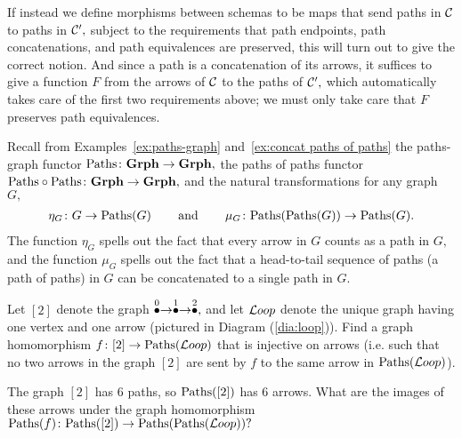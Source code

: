 \documentclass[CT4S-EN-RU]{subfiles}
\begin{document}
\begin{blockRUS}
\end{blockRUS}

\begin{blockENG}
If instead we define morphisms between schemas to be maps that send paths in $\mathcal{C}$ to paths in $\mathcal{C}',$ subject to the requirements that path endpoints, path concatenations, and path equivalences are preserved, this will turn out to give the correct notion. And since a path is a concatenation of its arrows, it suffices to give a function $F$ from the arrows of $\mathcal{C}$ to the paths of $\mathcal{C}',$ which automatically takes care of the first two requirements above; we must only take care that $F$ preserves path equivalences.
\end{blockENG}

\begin{blockRUS}
\end{blockRUS}

\begin{blockENG}
Recall from Examples~\ref{ex:paths-graph} and~\ref{ex:concat paths of paths} the paths-graph functor $\textnormal{Paths}\colon{\mathbf{Grph}}\rightarrow{\mathbf{Grph}},$ the paths of paths functor $\textnormal{Paths}\circ\textnormal{Paths}\colon{\mathbf{Grph}}\rightarrow{\mathbf{Grph}},$ and the natural transformations for any graph $G,$ 
\begin{align}\label{dia:proto paths monad}
\eta_G\colon G\rightarrow\textnormal{Paths}(G)\hspace{.3in}\textnormal{and}\hspace{.3in}\mu_G\colon\textnormal{Paths}(\textnormal{Paths}(G))\rightarrow\textnormal{Paths}(G).
\end{align}
The function $\eta_G$ spells out the fact that every arrow in $G$ counts as a path in $G,$ and the function $\mu_G$ spells out the fact that a head-to-tail sequence of paths (a path of paths) in $G$ can be concatenated to a single path in $G.$
\end{blockENG}

\begin{blockRUS}
\end{blockRUS}

\begin{exerciseENG}
Let $[2]$ denote the graph $\stackrel{0}{\bullet}\rightarrow\stackrel{1}{\bullet}\rightarrow\stackrel{2}{\bullet},$ and let ${\mathcal{L} oop}$ denote the unique graph having one vertex and one arrow (pictured in Diagram (\ref{dia:loop})).
\sexc Find a graph homomorphism $f\colon[2]\rightarrow\textnormal{Paths}({\mathcal{L} oop})$ that is injective on arrows (i.e. such that no two arrows in the graph $[2]$ are sent by $f$ to the same arrow in $\textnormal{Paths}({\mathcal{L} oop})$).
\item The graph $[2]$ has 6 paths, so $\textnormal{Paths}([2])$ has 6 arrows. What are the images of these arrows under the graph homomorphism $\textnormal{Paths}(f)\colon\textnormal{Paths}([2])\rightarrow\textnormal{Paths}(\textnormal{Paths}({\mathcal{L} oop}))?$ 
\endsexc
\end{exerciseENG}
\end{document}
